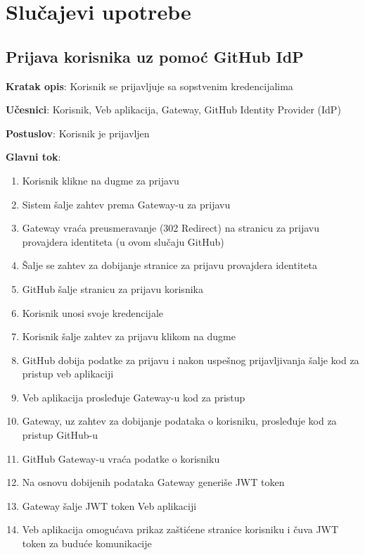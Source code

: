 \chapter{Slučajevi upotrebe}\label{ch:slucajevi_upotrebe}

\section{Prijava korisnika uz pomoć GitHub IdP}

\textbf{Kratak opis}: Korisnik se prijavljuje sa sopstvenim kredencijalima

\textbf{Učesnici}: Korisnik, Veb aplikacija, Gateway, GitHub Identity Provider (IdP)

\textbf{Postuslov}: Korisnik je prijavljen

\textbf{Glavni tok}:
\begin{enumerate}
    \item Korisnik klikne na dugme za prijavu
    \item Sistem šalje zahtev prema Gateway-u za prijavu
    \item Gateway vraća preusmeravanje (302 Redirect) na stranicu za prijavu 
    provajdera identiteta (u ovom slučaju GitHub)
    \item Šalje se zahtev za dobijanje stranice za prijavu provajdera 
    identiteta
    \item GitHub šalje stranicu za prijavu korisnika
    \item Korisnik unosi svoje kredencijale
    \item Korisnik šalje zahtev za prijavu klikom na dugme
    \item GitHub dobija podatke za prijavu i nakon uspešnog prijavljivanja 
    šalje kod za pristup veb aplikaciji
    \item Veb aplikacija prosleđuje Gateway-u kod za pristup
    \item Gateway, uz zahtev za dobijanje podataka o korisniku, prosleđuje 
    kod za pristup GitHub-u 
    \item GitHub Gateway-u vraća podatke o korisniku
    \item Na osnovu dobijenih podataka Gateway generiše JWT token
    \item Gateway šalje JWT token Veb aplikaciji
    \item Veb aplikacija omogućava prikaz zaštićene stranice korisniku 
    i čuva JWT token za buduće komunikacije
\end{enumerate}

